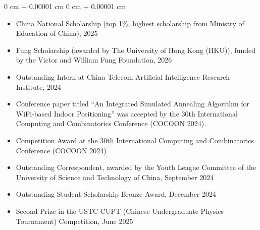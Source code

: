 \documentclass[10pt, letterpaper]{article}
\newenvironment{highlightsforbulletentries}{
    \begin{itemize}[
        topsep=0.10 cm,
        parsep=0.10 cm,
        partopsep=0pt,
        itemsep=0pt,
        leftmargin=10pt
    ]
}{
    \end{itemize}
} %
\newenvironment{onecolentry}{
    \begin{adjustwidth}{
        0 cm + 0.00001 cm
    }{
        0 cm + 0.00001 cm
    }
}{
    \end{adjustwidth}
} %
\begin{document}
    \begin{onecolentry}
        \begin{highlightsforbulletentries}
        \item China National Scholarship (top 1\%, highest scholarship from Ministry of Education of China), 2025

        \item Fung Scholarship (awarded by The University of Hong Kong (HKU)), funded by the Victor and William Fung Foundation, 2026
    

        \item Outstanding Intern at China Telecom Artificial Intelligence Research Institute, 2024

        \item Conference paper titled “An Integrated Simulated Annealing Algorithm for WiFi-based Indoor Positioning” was accepted by the 30th International Computing and Combinatorics Conference (COCOON 2024).

        \item Competition Award at the 30th International Computing and Combinatorics Conference (COCOON 2024)

        \item Outstanding Correspondent, awarded by the Youth League Committee of the University of Science and Technology of China, September 2024

        \item Outstanding Student Scholarship Bronze Award, December 2024

        \item Second Prize in the USTC CUPT (Chinese Undergraduate Physics Tournament) Competition, June 2025

        




        \end{highlightsforbulletentries}
    \end{onecolentry}
\end{document}
